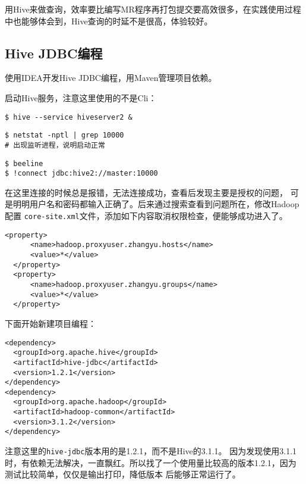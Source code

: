 用Hive来做查询，效率要比编写MR程序再打包提交要高效很多，在实践使用过程
中也能够体会到，Hive查询的时延不是很高，体验较好。

\subsection{Hive JDBC编程}

使用IDEA开发Hive JDBC编程，用Maven管理项目依赖。

启动Hive服务，注意这里使用的不是Cli：
\begin{lstlisting}[style=mysh,title=启动Hive服务]
$ hive --service hiveserver2 &
\end{lstlisting}
\begin{lstlisting}[style=mysh,title=查看Hive服务]
$ netstat -nptl | grep 10000
# 出现监听进程，说明启动正常
\end{lstlisting}
\begin{lstlisting}[style=mysh,title=启动beeline，并尝试连接]
$ beeline
$ !connect jdbc:hive2://master:10000
\end{lstlisting}

在这里连接的时候总是报错，无法连接成功，查看后发现主要是授权的问题，
可是明明用户名和密码都输入正确了。后来通过搜索查看到问题所在，修改Hadoop配置
\lstinline{core-site.xml}文件，添加如下内容取消权限检查，便能够成功进入了。

\begin{lstlisting}[style=myxml]
<property>
      <name>hadoop.proxyuser.zhangyu.hosts</name>
      <value>*</value>
  </property>
  <property>
      <name>hadoop.proxyuser.zhangyu.groups</name>
      <value>*</value>
  </property>
\end{lstlisting}

下面开始新建项目编程：

\begin{lstlisting}[style=myxml,title=POM文件依赖]
<dependency>
  <groupId>org.apache.hive</groupId>
  <artifactId>hive-jdbc</artifactId>
  <version>1.2.1</version>
</dependency>
<dependency>
  <groupId>org.apache.hadoop</groupId>
  <artifactId>hadoop-common</artifactId>
  <version>3.1.2</version>
</dependency>
\end{lstlisting}

注意这里的\lstinline{hive-jdbc}版本用的是1.2.1，而不是Hive的3.1.1。
因为发现使用3.1.1时，有依赖无法解决，一直飘红。所以找了一个使用量比较高的版本1.2.1，因为测试比较简单，仅仅是输出打印，降低版本
后能够正常运行了。



